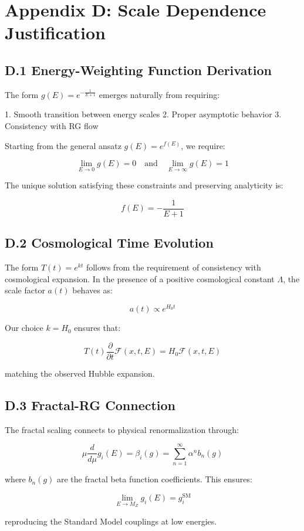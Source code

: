 \section*{Appendix D: Scale Dependence Justification}
\label{app:scale_dependence}

\subsection*{D.1 Energy-Weighting Function Derivation}
\label{subsec:energy_weighting}

The form $g(E) = e^{-\frac{1}{E+1}}$ emerges naturally from requiring:

1. Smooth transition between energy scales
2. Proper asymptotic behavior
3. Consistency with RG flow

Starting from the general ansatz $g(E) = e^{f(E)}$, we require:

\[
\lim_{E \to 0} g(E) = 0 \quad \text{and} \quad \lim_{E \to \infty} g(E) = 1
\]

The unique solution satisfying these constraints and preserving analyticity is:

\[
f(E) = -\frac{1}{E+1}
\]

\subsection*{D.2 Cosmological Time Evolution}
\label{subsec:cosmo_evolution}

The form $T(t) = e^{kt}$ follows from the requirement of consistency with cosmological expansion. In the presence of a positive cosmological constant $\Lambda$, the scale factor $a(t)$ behaves as:

\[
a(t) \propto e^{H_0t}
\]

Our choice $k = H_0$ ensures that:

\[
T(t) \frac{\partial}{\partial t} \mathcal{F}(x,t,E) = H_0 \mathcal{F}(x,t,E)
\]

matching the observed Hubble expansion.

\subsection*{D.3 Fractal-RG Connection}
\label{subsec:fractal_rg}

The fractal scaling connects to physical renormalization through:

\[
\mu \frac{d}{d\mu} g_i(E) = \beta_i(g) = \sum_{n=1}^{\infty} \alpha^n b_n(g)
\]

where $b_n(g)$ are the fractal beta function coefficients. This ensures:

\[
\lim_{E \to M_Z} g_i(E) = g_i^{\text{SM}}
\]

reproducing the Standard Model couplings at low energies. 